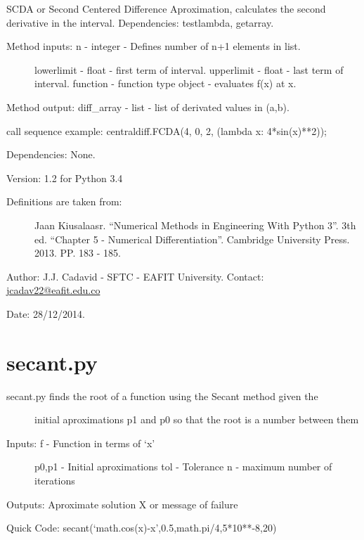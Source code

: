 \documentclass[letterpaper,10pt,oneside]{sphinxmanual}
\theoremstyle{plain}%
\theoremstyle{definition}%
\theoremstyle{remark}%
\begin{document}
SCDA or Second Centered Difference Aproximation, calculates the second
derivative in the interval. Dependencies: testlambda, getarray.
\begin{description}
\item[{Method inputs: n - integer - Defines number of n+1 elements in list.}] \leavevmode
lowerlimit - float - first term of interval.
upperlimit - float - last term of interval.
function - function type object - evaluates f(x) at x.

\end{description}

Method output: diff\_array - list - list of derivated values in (a,b).

call sequence example: centraldiff.FCDA(4, 0, 2, (lambda x: 4*sin(x)**2));

Dependencies: None.

Version: 1.2 for Python 3.4
\begin{description}
\item[{Definitions are taken from:}] \leavevmode
Jaan Kiusalaasr. ``Numerical Methods in Engineering With Python 3''.
3th ed. ``Chapter 5 - Numerical Differentiation''. 
Cambridge University Press. 2013. PP. 183 - 185.

\end{description}

Author: J.J. Cadavid - SFTC - EAFIT University.
Contact: \href{mailto:jcadav22@eafit.edu.co}{jcadav22@eafit.edu.co}

Date: 28/12/2014.


\section{secant.py}
\label{code:module-secant}\label{code:secant-py}\begin{description}
\item[{secant.py finds the root of a function using the Secant method given the}] \leavevmode
initial aproximations p1 and p0 so that the root is a number between them

\item[{Inputs: f - Function in terms of `x'}] \leavevmode
p0,p1 - Initial aproximations
tol - Tolerance
n - maximum number of iterations

\end{description}

Outputs: Aproximate solution X or message of failure

Quick Code: secant(`math.cos(x)-x',0.5,math.pi/4,5*10**-8,20)
\end{document}
